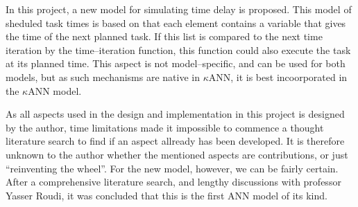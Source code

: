 






In this project, a new model for simulating time delay is proposed.
This model of sheduled task times is based on that each element contains a variable that gives the time of the next planned task.
If this list is compared to the next time iteration by the time--iteration function, this function could also execute the task at its planned time.
This aspect is not model--specific, and can be used for both models, but as such mechanisms are native in $\kappa$ANN, it is best incoorporated in the $\kappa$ANN model.

As all aspects used in the design and implementation in this project is designed by the author, time limitations made it impossible to commence a thought literature search to find if an aspect allready has been developed.
It is therefore unknown to the author whether the mentioned aspects are contributions, or just ``reinventing the wheel''.
For the new model, however, we can be fairly certain.
After a comprehensive literature search, and lengthy discussions with professor Yasser Roudi, it was concluded that this is the first ANN model of its kind.









